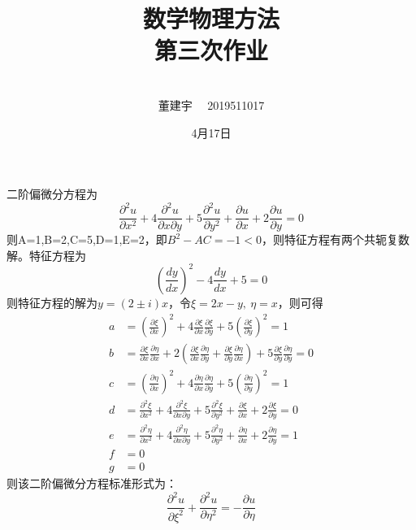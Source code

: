 \documentclass[10.5pt]{article}
\title{数学物理方法
\\第三次作业}
\author{\\董建宇 ~~2019511017}
\date{4月17日}
\begin{document}
    
\maketitle
\newpage

\section{}
\subsection{}
二阶偏微分方程为$$\frac{\partial^2u}{\partial x^2}+4\frac{\partial^2u}{\partial x\partial y}+5\frac{\partial^2u}{\partial y^2}+\frac{\partial u}{\partial x}+2\frac{\partial u}{\partial y}=0$$\indent
则A=1,B=2,C=5,D=1,E=2，即$B^2-AC=-1<0$，则特征方程有两个共轭复数解。特征方程为$$\left(\frac{dy}{dx}\right)^2-4\frac{dy}{dx}+5=0$$\indent
则特征方程的解为$y=(2\pm i)x$，令$\xi =2x-y,~\eta =x$，则可得$$\begin{aligned}
    a&=\left(\frac{\partial\xi}{\partial x}\right)^2+4\frac{\partial\xi}{\partial x}\frac{\partial\xi}{\partial y}+5\left(\frac{\partial\xi}{\partial y}\right)^2=1\\
    b&=\frac{\partial\xi}{\partial x}\frac{\partial\eta}{\partial x}+2\left(\frac{\partial\xi}{\partial x}\frac{\partial\eta}{\partial y}+\frac{\partial\xi}{\partial y}\frac{\partial\eta}{\partial x}\right)+5\frac{\partial\xi}{\partial y}\frac{\partial\eta}{\partial y}=0\\
    c&=\left(\frac{\partial\eta}{\partial x}\right)^2+4\frac{\partial\eta}{\partial x}\frac{\partial\eta}{\partial y}+5\left(\frac{\partial\eta}{\partial y}\right)^2=1\\
    d&=\frac{\partial^2\xi}{\partial x^2}+4\frac{\partial^2\xi}{\partial x\partial y}+5\frac{\partial^2\xi}{\partial y^2}+\frac{\partial\xi}{\partial x}+2\frac{\partial\xi}{\partial y}=0\\
    e&=\frac{\partial^2\eta}{\partial x^2}+4\frac{\partial^2\eta}{\partial x\partial y}+5\frac{\partial^2\eta}{\partial y^2}+\frac{\partial\eta}{\partial x}+2\frac{\partial\eta}{\partial y}=1\\
    f&=0\\
    g&=0
\end{aligned}$$\indent
则该二阶偏微分方程标准形式为：$$\frac{\partial^2u}{\partial\xi^2}+\frac{\partial^2u}{\partial\eta^2}=-\frac{\partial u}{\partial\eta}$$
\end{document}
